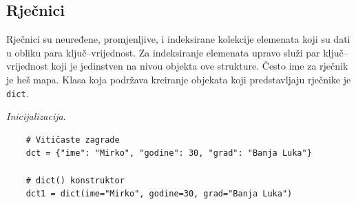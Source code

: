 
\subsection{Rječnici}
Rječnici su neuređene, promjenljive, i indeksirane kolekcije elemenata koji su dati u obliku para ključ--vrijednost. Za indeksiranje elemenata upravo služi par ključ--vrijednost koji je jedinstven na nivou objekta ove strukture. Često ime za rječnik je heš mapa. Klasa koja podržava kreiranje objekata koji predstavljaju rječnike je \texttt{dict}. 

\textit{Inicijalizacija}.  

\begin{verbatim}
	# Vitičaste zagrade
	dct = {"ime": "Mirko", "godine": 30, "grad": "Banja Luka"}
	
	# dict() konstruktor
	dct1 = dict(ime="Mirko", godine=30, grad="Banja Luka")
\end{verbatim}


